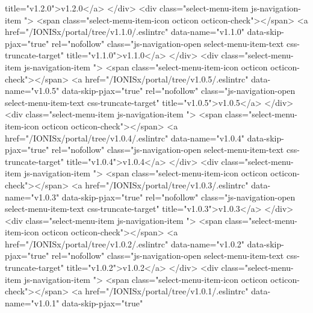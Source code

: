                 title="v1.2.0">v1.2.0</a>
            </div>
            <div class="select-menu-item js-navigation-item ">
              <span class="select-menu-item-icon octicon octicon-check"></span>
              <a href="/IONISx/portal/tree/v1.1.0/.eslintrc"
                 data-name="v1.1.0"
                 data-skip-pjax="true"
                 rel="nofollow"
                 class="js-navigation-open select-menu-item-text css-truncate-target"
                 title="v1.1.0">v1.1.0</a>
            </div>
            <div class="select-menu-item js-navigation-item ">
              <span class="select-menu-item-icon octicon octicon-check"></span>
              <a href="/IONISx/portal/tree/v1.0.5/.eslintrc"
                 data-name="v1.0.5"
                 data-skip-pjax="true"
                 rel="nofollow"
                 class="js-navigation-open select-menu-item-text css-truncate-target"
                 title="v1.0.5">v1.0.5</a>
            </div>
            <div class="select-menu-item js-navigation-item ">
              <span class="select-menu-item-icon octicon octicon-check"></span>
              <a href="/IONISx/portal/tree/v1.0.4/.eslintrc"
                 data-name="v1.0.4"
                 data-skip-pjax="true"
                 rel="nofollow"
                 class="js-navigation-open select-menu-item-text css-truncate-target"
                 title="v1.0.4">v1.0.4</a>
            </div>
            <div class="select-menu-item js-navigation-item ">
              <span class="select-menu-item-icon octicon octicon-check"></span>
              <a href="/IONISx/portal/tree/v1.0.3/.eslintrc"
                 data-name="v1.0.3"
                 data-skip-pjax="true"
                 rel="nofollow"
                 class="js-navigation-open select-menu-item-text css-truncate-target"
                 title="v1.0.3">v1.0.3</a>
            </div>
            <div class="select-menu-item js-navigation-item ">
              <span class="select-menu-item-icon octicon octicon-check"></span>
              <a href="/IONISx/portal/tree/v1.0.2/.eslintrc"
                 data-name="v1.0.2"
                 data-skip-pjax="true"
                 rel="nofollow"
                 class="js-navigation-open select-menu-item-text css-truncate-target"
                 title="v1.0.2">v1.0.2</a>
            </div>
            <div class="select-menu-item js-navigation-item ">
              <span class="select-menu-item-icon octicon octicon-check"></span>
              <a href="/IONISx/portal/tree/v1.0.1/.eslintrc"
                 data-name="v1.0.1"
                 data-skip-pjax="true"
